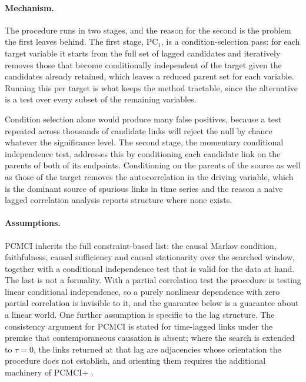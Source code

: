 \paragraph{Mechanism.} The procedure runs in two stages, and the reason for the second is the problem the first leaves behind. The first stage, PC$_1$, is a condition-selection pass: for each target variable it starts from the full set of lagged candidates and iteratively removes those that become conditionally independent of the target given the candidates already retained, which leaves a reduced parent set for each variable. Running this per target is what keeps the method tractable, since the alternative is a test over every subset of the remaining variables.

Condition selection alone would produce many false positives, because a test repeated across thousands of candidate links will reject the null by chance whatever the significance level. The second stage, the momentary conditional independence test, addresses this by conditioning each candidate link on the parents of both of its endpoints. Conditioning on the parents of the source as well as those of the target removes the autocorrelation in the driving variable, which is the dominant source of spurious links in time series and the reason a naive lagged correlation analysis reports structure where none exists.

\paragraph{Assumptions.} PCMCI inherits the full constraint-based list: the causal Markov condition, faithfulness, causal sufficiency and causal stationarity over the searched window, together with a conditional independence test that is valid for the data at hand. The last is not a formality. With a partial correlation test the procedure is testing linear conditional independence, so a purely nonlinear dependence with zero partial correlation is invisible to it, and the guarantee below is a guarantee about a linear world. One further assumption is specific to the lag structure. The consistency argument for PCMCI is stated for time-lagged links under the premise that contemporaneous causation is absent; where the search is extended to $\tau = 0$, the links returned at that lag are adjacencies whose orientation the procedure does not establish, and orienting them requires the additional machinery of PCMCI+ \cite{runge2020pcmciplus}.

